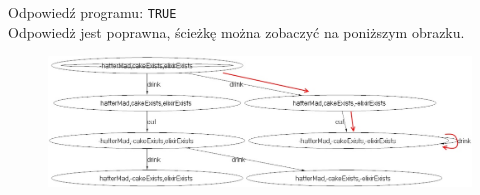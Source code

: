 \documentclass{article}
\begin{document}
\begin{itemize}
    Odpowiedź programu: \texttt{TRUE}\\
    Odpowiedż jest poprawna, ścieżkę można zobaczyć na poniższym obrazku.
    \begin{figure}[H]
    \centering
    \includegraphics[scale=0.5]{test3_5}
    \end{figure}
    
    
\end{itemize}

\newpage
\end{document}
